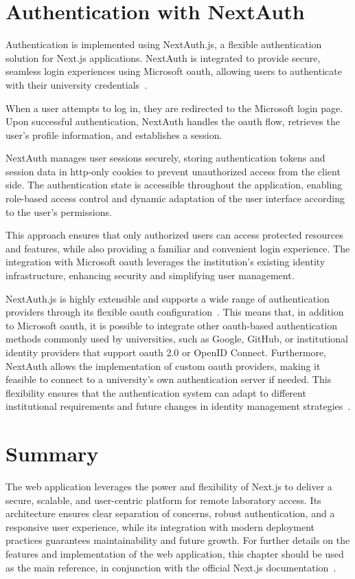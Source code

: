 \section{Authentication with NextAuth}

Authentication is implemented using NextAuth.js, a flexible authentication solution for Next.js applications. NextAuth is integrated to provide secure, seamless login experiences using Microsoft \ac{oauth}, allowing users to authenticate with their university credentials~\cite{nextjs-authentication}.

When a user attempts to log in, they are redirected to the Microsoft login page. Upon successful authentication, NextAuth handles the \ac{oauth} flow, retrieves the user's profile information, and establishes a session.

NextAuth manages user sessions securely, storing authentication tokens and session data in \ac{http}-only cookies to prevent unauthorized access from the client side. The authentication state is accessible throughout the application, enabling role-based access control and dynamic adaptation of the user interface according to the user's permissions.

This approach ensures that only authorized users can access protected resources and features, while also providing a familiar and convenient login experience. The integration with Microsoft \ac{oauth} leverages the institution's existing identity infrastructure, enhancing security and simplifying user management.

NextAuth.js is highly extensible and supports a wide range of authentication providers through its flexible \ac{oauth} configuration~\cite{nextjs-authentication}. This means that, in addition to Microsoft \ac{oauth}, it is possible to integrate other \ac{oauth}-based authentication methods commonly used by universities, such as Google, GitHub, or institutional identity providers that support \ac{oauth} 2.0 or OpenID Connect. Furthermore, NextAuth allows the implementation of custom \ac{oauth} providers, making it feasible to connect to a university's own authentication server if needed. This flexibility ensures that the authentication system can adapt to different institutional requirements and future changes in identity management strategies~\cite{nextjs-authentication}.

\section{Summary}

The web application leverages the power and flexibility of Next.js to deliver a secure, scalable, and user-centric platform for remote laboratory access. Its architecture ensures clear separation of concerns, robust authentication, and a responsive user experience, while its integration with modern deployment practices guarantees maintainability and future growth. For further details on the features and implementation of the web application, this chapter should be used as the main reference, in conjunction with the official Next.js documentation~\cite{nextjs-docs}. 